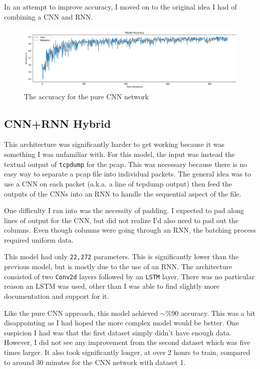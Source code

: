 \documentclass[fleqn,11pt]{article}
\begin{document}
In an attempt to improve accuracy, I moved on to the original idea I had of combining a CNN and RNN.

\begin{figure}[H]
    \centering
    \includegraphics[width=.95\linewidth]{cnn_acc.png}
    \caption{The accuracy for the pure CNN network}
\end{figure}

\subsection{CNN+RNN Hybrid}
This architecture was significantly harder to get working because it was something I was unfamiliar with.
For this model, the input was instead the textual output of \texttt{tcpdump} for the pcap.
This was necessary because there is no easy way to separate a pcap file into individual packets.
The general idea was to use a CNN on each packet (a.k.a. a line of tcpdump output) then feed the outputs of the CNNs into an RNN to handle the sequential aspect of the file.

One difficulty I ran into was the necessity of padding.
I expected to pad along lines of output for the CNN, but did not realize I'd also need to pad out the columns. Even though columns were going through an RNN, the batching process required uniform data.

This model had only \texttt{22,272} parameters. 
This is significantly lower than the previous model, but is mostly due to the use of an RNN.
The architecture consisted of two \texttt{Conv2d} layers followed by an \texttt{LSTM} layer.
There was no particular reason an LSTM was used, other than I was able to find slightly more documentation and support for it.

Like the pure CNN approach, this model achieved $\sim\%90$ accuracy. 
This was a bit disappointing as I had hoped the more complex model would be better.
One suspicion I had was that the first dataset simply didn't have enough data.
However, I did not see any improvement from the second dataset which was five times larger.
It also took significantly longer, at over 2 hours to train, compared to around 30 minutes for the CNN network with dataset 1.
\end{document}
